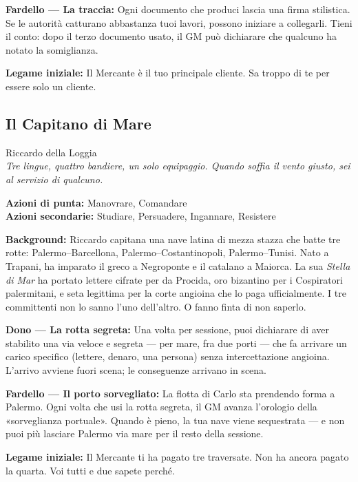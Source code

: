 \textbf{Fardello — La traccia:} Ogni documento che produci lascia
una firma stilistica. Se le autorità catturano abbastanza tuoi
lavori, possono iniziare a collegarli. Tieni il conto: dopo il
terzo documento usato, il GM può dichiarare che qualcuno ha notato
la somiglianza.

\textbf{Legame iniziale:} Il Mercante è il tuo principale cliente.
Sa troppo di te per essere solo un cliente.

\filetto

\subsection{Il Capitano di Mare}
{\cinzel\footnotesize\color{grigionote} Riccardo della Loggia}\\
\textit{Tre lingue, quattro bandiere, un solo equipaggio. Quando
soffia il vento giusto, sei al servizio di qualcuno.}

\textbf{Azioni di punta:} Manovrare, Comandare\\
\textbf{Azioni secondarie:} Studiare, Persuadere, Ingannare, Resistere

\textbf{Background:} Riccardo capitana una nave latina di mezza
stazza che batte tre rotte: Palermo–Barcellona,
Palermo–Costantinopoli, Palermo–Tunisi. Nato a Trapani, ha
imparato il greco a Negroponte e il catalano a Maiorca. La sua
\textit{Stella di Mar} ha portato lettere cifrate per da Procida,
oro bizantino per i Cospiratori palermitani, e seta legittima
per la corte angioina che lo paga ufficialmente. I tre committenti
non lo sanno l'uno dell'altro. O fanno finta di non saperlo.

\textbf{Dono — La rotta segreta:} Una volta per sessione, puoi
dichiarare di aver stabilito una via veloce e segreta — per
mare, fra due porti — che fa arrivare un carico specifico
(lettere, denaro, una persona) senza intercettazione angioina.
L'arrivo avviene fuori scena; le conseguenze arrivano in scena.

\textbf{Fardello — Il porto sorvegliato:} La flotta di Carlo sta
prendendo forma a Palermo. Ogni volta che usi la rotta segreta,
il GM avanza l'orologio della «sorveglianza portuale». Quando
è pieno, la tua nave viene sequestrata — e non puoi più lasciare
Palermo via mare per il resto della sessione.

\textbf{Legame iniziale:} Il Mercante ti ha pagato tre traversate.
Non ha ancora pagato la quarta. Voi tutti e due sapete perché.

\secsep

